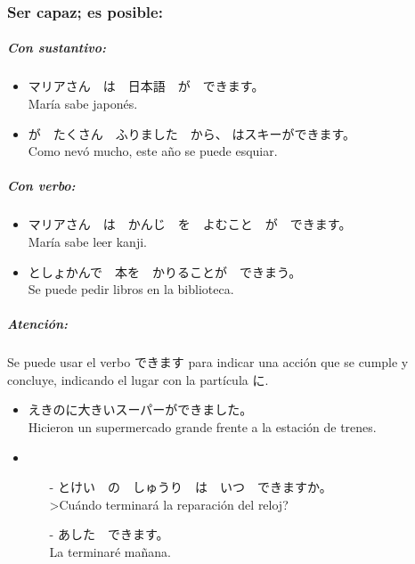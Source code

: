 \documentclass[a4paper,12pt,oneside]{report}
\def\bv{\textbf{V}} %
\def\bs{\textbf{S}} %
\begin{document}
\begin{CJK*}{UTF8}{min}
      \subsubsection{Ser capaz; es posible:}
        \fbox{\bs / \bv(じしょ) こと　が　できます}

        \subparagraph{Con sustantivo:}

        \begin{itemize}
          \item マリアさん　は　日本語　が　できます。\\
                Mar\'ia sabe japon\'es.
          \item {}が　たくさん　ふりました　から、 はスキーができます。\\
                Como nev\'o mucho, este año se puede esquiar.
        \end{itemize}

        \subparagraph{Con verbo:}

        \begin{itemize}
          \item マリアさん　は　かんじ　を　よむこと　が　できます。\\
                Mar\'ia sabe leer kanji.
          \item としょかんで　本を　かりることが　できまう。\\
                Se puede pedir libros en la biblioteca.
        \end{itemize}

        \subparagraph{Atenci\'on:}
          Se puede usar el verbo {できます} para indicar una acci\'on que se cumple y concluye, indicando el lugar con la part\'icula に.

        \begin{itemize}
          \item えきのに大きいスーパーができました。\\
                Hicieron un supermercado grande frente a la estaci\'on de trenes.
          \item
            \begin{itemize}
              \item[-] とけい　の　しゅうり　は　いつ　できますか。\\
                       >Cu\'ando terminar\'a la reparaci\'on del reloj?
              \item[-] あした　できます。\\
                       La terminar\'e mañana.
            \end{itemize}
        \end{itemize}


\end{CJK*}
\end{document}
